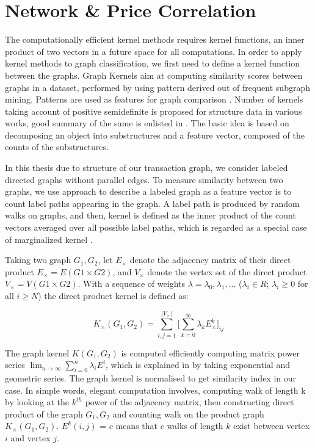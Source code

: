 \documentclass[12pt,a4paper]{article}
\numberwithin{equation}{section}
\numberwithin{figure}{section}
\numberwithin{table}{section}
\begin{document}
\section{Network \& Price Correlation} \label{sec:NPC}

The computationally efficient kernel methods requires kernel functions, an inner product of two vectors in a future space for all computations. In order to apply kernel methods to graph classification, we first need to define a kernel function between the graphs. Graph Kernels aim at computing similarity scores between graphs in a dataset, performed by using pattern derived out of  frequent subgraph mining. Patterns are used as features for graph comparison \citep{Deshpande2005}. Number of kernels taking account of positive semidefinite is proposed for structure data in various works, good summary of the same is enlisted in \citet{Vishwanathan2010}. The basic idea is based on decomposing an object into substructures and a feature vector, composed of the counts of the substructures. 

In this thesis due to structure of our transaction graph, we consider labeled directed graphs without parallel edges. To measure similarity between two graphs, we use \citet{Gartner2003} approach to describe a labeled graph as a
feature vector is to count label paths appearing in the graph.  A label path is produced by random walks on graphs, and then, kernel is defined as the inner product of the count vectors averaged over all possible label paths, which is regarded as a special case of marginalized kernel \citep{Vishwanathan2010}. 

Taking two graph $G_{1}, G_{2}$, let $E_{\times}$ denote the adjacency matrix
of their direct product $E_{\times} = E (G1 \times G2) $, and $V_{\times}$ denote the vertex set of the direct product  $V_{\times} = V (G1 \times G2) $. With a sequence of weights $\lambda = \lambda_{0}, \lambda_{1},...$
($\lambda_{i} \in R$; $\lambda_{i} \geq 0$ for all $i \geq N$) the direct product kernel is defined as:

%
\begin{equation}
K_{\times} (G_{1}, G_{2}) = \displaystyle\sum_{i,j=1}^{| V_{\times} |} \Bigg[ \displaystyle\sum_{k=0}^{\infty} \lambda_{k}E_{\times}^{k} \Bigg]_{ij}
\end{equation}
%

The graph kernel $K(G_{1}, G_{2})$ is computed efficiently computing matrix power series $\lim_{n \to \infty} \sum_{i=0}^{n} \lambda_{i}E^{i}$, which is explained in \citet{Gartner2003} by taking exponential and geometric series. The graph kernel is normalised to get similarity index in our case. In simple words, elegant computation involves, computing walk of length k by looking at the $k^{th}$ power of the adjacency matrix, then constructing direct product of the graph $G_{1}, G_{2}$ and counting walk on the product graph $K_{\times} (G_{1}, G_{2})$.  $E^{k} (i,j)$ = $c$ means that $c$ walks of length $k$ exist between vertex $i$ and vertex $j$.
\end{document}
